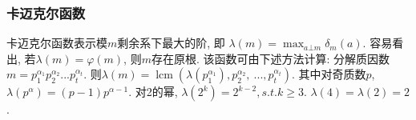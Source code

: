 \subsubsection{卡迈克尔函数}
卡迈克尔函数表示模$m$剩余系下最大的阶, 即 $\lambda(m)=\max_{a\bot m} \delta_m(a)$. 容易看出, 若$\lambda(m)=\varphi(m)$, 则$m$存在原根. 该函数可由下述方法计算: 分解质因数$m=p_1^{\alpha_1}p_2^{\alpha_2}...p_t^{\alpha_t}$. 则$\lambda(m)=\operatorname{lcm}(\lambda(p_1^{\alpha_1}),p_2^{\alpha_2},\ ..., p_t^{\alpha_t})$. 其中对奇质数$p$, $\lambda(p^\alpha)=(p-1)p^{\alpha-1}$. 对2的幂, $\lambda(2^k)=2^{k-2}, s.t. k\ge 3$. $\lambda(4)=\lambda(2)=2$.